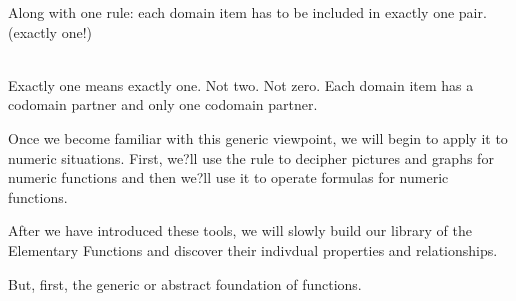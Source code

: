 \documentclass{ximera}
\begin{document}
Along with one rule: each domain item has to be included in exactly one pair. (exactly one!)

\quad \\

Exactly one means exactly one.  Not two. Not zero. Each domain item has a codomain partner and only one codomain partner.

Once we become familiar with this generic viewpoint, we will begin to apply it to numeric situations.  First, we?ll use the rule to decipher pictures and graphs for numeric functions and then we?ll use it to operate formulas for numeric functions.

After we have introduced these tools, we will slowly build our library of the Elementary Functions and discover their indivdual properties and relationships.

But, first, the generic or abstract foundation of functions.
\end{document}
